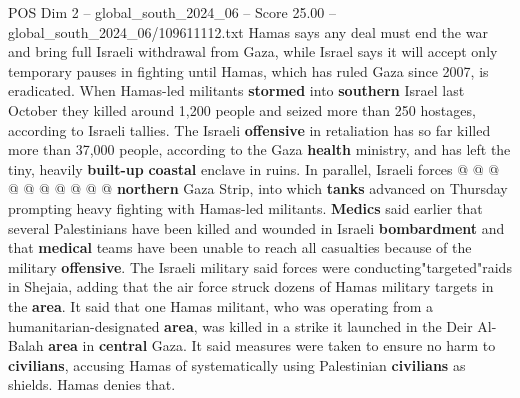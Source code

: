 \begin{textsample}{POS Dim 2 – global\_south\_2024\_06 – Score 25.00 – global\_south\_2024\_06/109611112.txt}
Hamas says any deal must end the war and bring full Israeli withdrawal from Gaza, while Israel says it will accept only temporary pauses in fighting until Hamas, which has ruled Gaza since 2007, is eradicated.
When Hamas-led militants \textbf{stormed} into \textbf{southern} Israel last October they killed around 1,200 people and seized more than 250 hostages, according to Israeli tallies.
The Israeli \textbf{offensive} in retaliation has so far killed more than 37,000 people, according to the Gaza \textbf{health} ministry, and has left the tiny, heavily \textbf{built-up} \textbf{coastal} enclave in ruins.
In parallel, Israeli forces @ @ @ @ @ @ @ @ @ @ \textbf{northern} Gaza Strip, into which \textbf{tanks} advanced on Thursday prompting heavy fighting with Hamas-led militants. \textbf{Medics} said earlier that several Palestinians have been killed and wounded in Israeli \textbf{bombardment} and that \textbf{medical} teams have been unable to reach all casualties because of the military \textbf{offensive}.
The Israeli military said forces were conducting"targeted"raids in Shejaia, adding that the air force struck dozens of Hamas military targets in the \textbf{area}.
It said that one Hamas militant, who was operating from a humanitarian-designated \textbf{area}, was killed in a strike it launched in the Deir Al-Balah \textbf{area} in \textbf{central} Gaza.
It said measures were taken to ensure no harm to \textbf{civilians}, accusing Hamas of systematically using Palestinian \textbf{civilians} as shields.
Hamas denies that.

\end{textsample}
